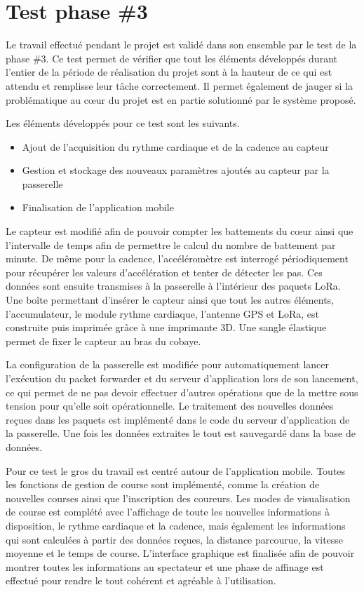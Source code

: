 
\chapter{Test phase \#3}\label{ch:test_3}

Le travail effectué pendant le projet est validé dans son ensemble par le test de la phase \#3. Ce test permet de vérifier que tout les éléments développés durant l'entier de la période de réalisation du projet sont à la hauteur de ce qui est attendu et remplisse leur tâche correctement. Il permet également de jauger si la problématique au cœur du projet est en partie solutionné par le système proposé.

Les éléments développés pour ce test sont les suivants.

\begin{itemize}
\item Ajout de l'acquisition du rythme cardiaque et de la cadence au capteur
\item Gestion et stockage des nouveaux paramètres ajoutés au capteur par la passerelle
\item Finalisation de l'application mobile
\end{itemize}

Le capteur est modifié afin de pouvoir compter les battements du cœur ainsi que l'intervalle de temps afin de permettre le calcul du nombre de battement par minute. De même pour la cadence, l'accéléromètre est interrogé périodiquement pour récupérer les valeurs d'accélération et tenter de détecter les pas. Ces données sont ensuite transmises à la passerelle à l'intérieur des paquets LoRa.
Une boîte permettant d'insérer le capteur ainsi que tout les autres éléments, l'accumulateur, le module rythme cardiaque, l'antenne GPS et LoRa, est construite puis imprimée grâce à une imprimante 3D. Une sangle élastique permet de fixer le capteur au bras du cobaye.

La configuration de la passerelle est modifiée pour automatiquement lancer l'exécution du packet forwarder et du serveur d'application lors de son lancement, ce qui permet de ne pas devoir effectuer d'autres opérations que de la mettre sous tension pour qu'elle soit opérationnelle.
Le traitement des nouvelles données reçues dans les paquets est implémenté dans le code du serveur d'application de la passerelle. Une fois les données extraites le tout est sauvegardé dans la base de données.

Pour ce test le gros du travail est centré autour de l'application mobile. Toutes les fonctions de gestion de course sont implémenté, comme la création de nouvelles courses ainsi que l'inscription des coureurs. Les modes de visualisation de course est complété avec l'affichage de toute les nouvelles informations à disposition, le rythme cardiaque et la cadence, mais également les informations qui sont calculées à partir des données reçues, la distance parcourue, la vitesse moyenne et le temps de course. L'interface graphique est finalisée afin de pouvoir montrer toutes les informations au spectateur et une phase de affinage est effectué pour rendre le tout cohérent et agréable à l'utilisation.

